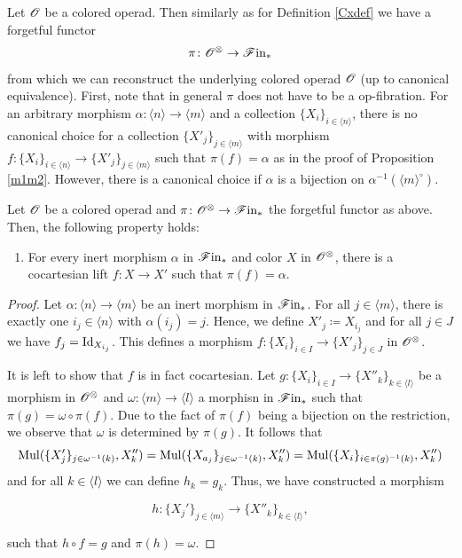 Let $\mathscr{O}$ be a colored operad. Then similarly as for Definition \ref{Cxdef} we
have a forgetful functor 
\[
\pi \colon \mathscr{O}^{\otimes} \to \mathscr{F} \text{in}_{\ast}
\]
from which we can reconstruct the underlying colored operad $\mathscr{O}$ (up to
canonical equivalence). First, note that in general $\pi$ does not have to be a
op-fibration. For an arbitrary morphism $\alpha \colon \langle n \rangle \to
\langle m \rangle$ and a collection $\{X_i\}_{i \in \langle n \rangle}$, there
is no canonical choice for a collection $\{X'_j\}_{j \in \langle m \rangle}$
with morphism $f \colon \{X_i\}_{i \in \langle n \rangle} \to \{X'_j\}_{j \in
\langle m \rangle}$ such that $\pi(f)=\alpha$ as in the proof of Proposition
\ref{m1m2}. However, there is a canonical choice if $\alpha$ is a bijection on
$\alpha^{-1}(\langle m \rangle^{\circ})$. 
\begin{prop}
    Let $\mathscr{O}$ be a colored operad and $\pi \colon \mathscr{O}^{\otimes} \to \mathscr{F} \text{in}_{\ast}$ the forgetful
    functor as above. Then, the following property holds:
    \begin{enumerate}[(M1')]
    \item For every inert morphism $\alpha$ in $\mathscr{F} \text{in}_{\ast}$ and color $X$ in $\mathscr{O}^{\otimes}$,
    there is a cocartesian lift $f \colon X \to X'$ such that $\pi(f)=\alpha$.
    \end{enumerate}
\end{prop}

\begin{proof}
    Let $\alpha \colon \langle n \rangle \to \langle m \rangle$ be an inert
    morphism in $\mathscr{F} \text{in}_{\ast}$. For all $j \in \langle m \rangle$, there is exactly one
    $i_j \in \langle n \rangle$ with $\alpha(i_j) = j$. Hence, we define $X'_j
    \coloneqq X_{i_j}$ and for all $j \in J$ we have $f_j = \operatorname{Id}_{X_{i_j}}$. This
    defines a morphism $f \colon \{X_i\}_{i \in I} \to \{X'_j\}_{j \in J}$ in
    $\mathscr{O}^{\otimes}$.

    It is left to show that $f$ is in fact cocartesian. Let $g \colon \{X_i\}_{i
    \in I} \to \{X''_k\}_{k \in \langle  l \rangle}$ be a morphism in $\mathscr{O}^{\otimes}$ and
    $\omega \colon \langle m \rangle \to \langle l \rangle$ a morphisn in $\mathscr{F} \text{in}_{\ast}$
    such that $\pi(g) = \omega \circ \pi(f)$. Due to the fact of $\pi(f)$ being
    a bijection on the restriction, we observe that $\omega$ is determined by
    $\pi(g)$. It follows that
    \[
        \operatorname{Mul}(\{X_j'\}_{j \in \omega^{-1}(k)}, X_k'') = \operatorname{Mul}(\{X_{a_j}\}_{j \in \omega^{-1}(k)}, X_k'') = \operatorname{Mul}(\{X_i\}_{i \in \pi(g)^{-1}(k)}, X_k'')
    \]
    and for all $k \in \langle l \rangle$ we can define $h_k = g_k$. Thus, we
    have constructed a morphism 

    $$h \colon \{X_j'\}_{j \in \langle m \rangle} \to \{X''_k\}_{k \in \langle l
    \rangle},$$
    
    such that $h \circ f = g$ and $\pi(h)=\omega$. 
\end{proof}


